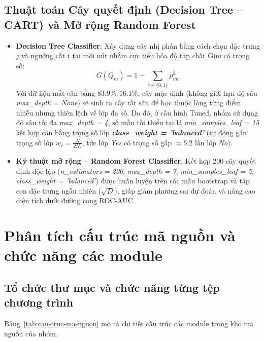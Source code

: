 \subsection{Thuật toán Cây quyết định (Decision Tree -- CART) và Mở rộng Random Forest}
\begin{itemize}
    \item \textbf{Decision Tree Classifier}: Xây dựng cây nhị phân bằng cách chọn đặc trưng $j$ và ngưỡng cắt $t$ tại mỗi nút nhằm cực tiểu hóa độ tạp chất Gini có trọng số:
    \[
        G(Q_m) = 1 - \sum_{c \in \{0,1\}} p_{mc}^2
    \]
    Với dữ liệu mất cân bằng $83.9\% : 16.1\%$, cây mặc định (không giới hạn độ sâu \textit{max\_depth = None}) sẽ sinh ra cây rất sâu để học thuộc lòng từng điểm nhiễu nhưng thiên lệch về lớp đa số. Do đó, ở cấu hình Tuned, nhóm sử dụng độ sâu tối đa \textit{max\_depth = 4}, số mẫu tối thiểu tại lá \textit{min\_samples\_leaf = 15} kết hợp cân bằng trọng số lớp \textbf{\textit{class\_weight = 'balanced'}} (tự động gán trọng số lớp $w_c = \frac{N}{2 N_c}$, tức lớp \textit{Yes} có trọng số gấp $\approx 5.2$ lần lớp \textit{No}).
    \item \textbf{Kỹ thuật mở rộng -- Random Forest Classifier}: Kết hợp $200$ cây quyết định độc lập (\textit{n\_estimators = 200}, \textit{max\_depth = 7}, \textit{min\_samples\_leaf = 5}, \textit{class\_weight = 'balanced'}) được huấn luyện trên các mẫu bootstrap và tập con đặc trưng ngẫu nhiên ($\sqrt{D}$), giúp giảm phương sai dự đoán và nâng cao diện tích dưới đường cong ROC-AUC.
\end{itemize}

\section{Phân tích cấu trúc mã nguồn và chức năng các module}

\subsection{Tổ chức thư mục và chức năng từng tệp chương trình}
Bảng~\ref{tab:cau-truc-ma-nguon} mô tả chi tiết cấu trúc các module trong kho mã nguồn của nhóm.

